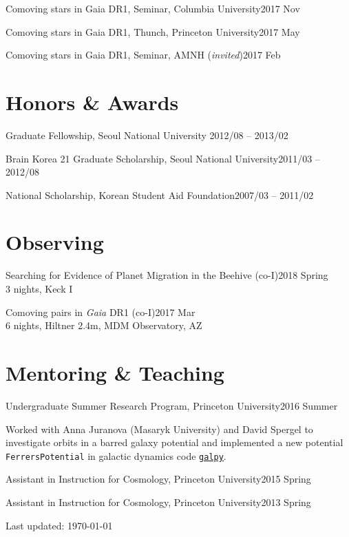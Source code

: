 \documentclass[11pt,letterpaper]{article}
\renewenvironment{itemize}{
  \begin{list}{}{
    \setlength{\leftmargin}{1.5em}
  }
}{
  \end{list}
}
\begin{document}
\begin{itemize}
  \setlength{\itemsep}{0em}

  \item Comoving stars in Gaia DR1, Seminar, Columbia University\hfill 2017 Nov
  \item Comoving stars in Gaia DR1, Thunch, Princeton University\hfill 2017 May
  \item Comoving stars in Gaia DR1, Seminar, AMNH ({\it invited})\hfill 2017 Feb
\end{itemize}

\section*{Honors \& Awards}

\begin{itemize}
  \setlength{\itemsep}{0em}

  \item Graduate Fellowship, Seoul National University \hfill 2012/08 -- 2013/02
  \item Brain Korea 21 Graduate Scholarship, Seoul National University\hfill 2011/03 -- 2012/08
	\item National Scholarship, Korean Student Aid Foundation\hfill 2007/03 -- 2011/02
\end{itemize}

\section*{Observing}
\begin{itemize}
  \item Searching for Evidence of Planet Migration in the Beehive (co-I)\hfill 2018 Spring\\
    3 nights, Keck I
  \item Comoving pairs in {\it Gaia} DR1 (co-I)\hfill 2017 Mar\\
    6 nights, Hiltner 2.4m, MDM Observatory, AZ
\end{itemize}

\section*{Mentoring \& Teaching}

\begin{itemize}
  \setlength\itemsep{0em}
  \item Undergraduate Summer Research Program, Princeton University\hfill 2016 Summer
    \begin{adjustwidth}{15pt}{}
      Worked with Anna Juranova (Masaryk University) and David Spergel to
      investigate orbits in a barred galaxy potential and implemented a new
      potential {\tt FerrersPotential} in galactic dynamics code \href{http://galpy.readthedocs.io/en/latest/}{\tt galpy}.
    \end{adjustwidth}
  \item Assistant in Instruction for Cosmology, Princeton University\hfill 2015 Spring
  \item Assistant in Instruction for Cosmology, Princeton University\hfill 2013 Spring
\end{itemize}

\bigskip

\begin{center}
  \begin{footnotesize}
    Last updated: \today \\
  \end{footnotesize}
\end{center}
\end{document}
